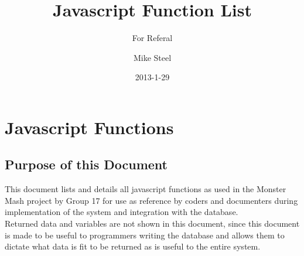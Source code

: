 \documentclass{project}
\begin{document}
\title{Javascript Function List}
\subtitle{For Referal}
\author{Mike Steel}
\date{2013-1-29}
\maketitle
\tableofcontents
\newpage
\section{Javascript Functions}
\subsection{Purpose of this Document}
This document lists and details all javascript functions as used in the Monster Mash project by Group 17 for use as reference by coders and documenters during implementation of the system and integration with the database.\\
Returned data and variables are not shown in this document, since this document is made to be useful to programmers writing the database and allows them to dictate what data is fit to be returned as is useful to the entire system.
\newpage
\end{document}
